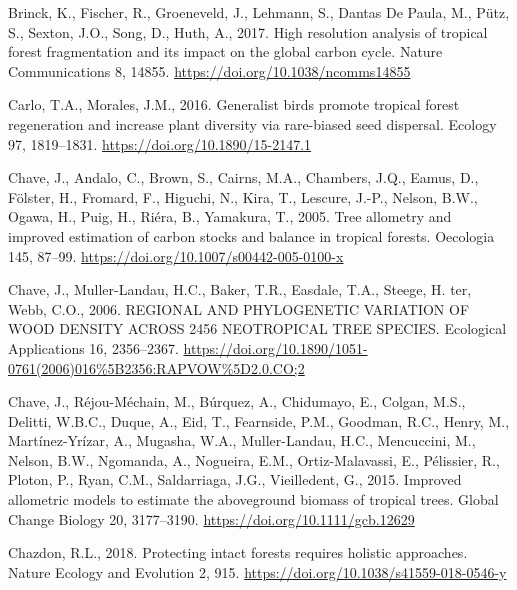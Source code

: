 \documentclass[
  12pt,
]{article}
\newlength{\cslhangindent}
\newlength{\cslentryspacingunit} %
\newenvironment{CSLReferences}[2] %
 {%
  \setlength{\parindent}{0pt}
  \ifodd #1
  \let\oldpar\par
  \def\par{\hangindent=\cslhangindent\oldpar}
  \fi
  \setlength{\parskip}{#2\cslentryspacingunit}
 }%
 {}
\begin{document}
\begin{CSLReferences}{1}{0}
\leavevmode{}%
Brinck, K., Fischer, R., Groeneveld, J., Lehmann, S., Dantas De Paula, M., Pütz, S., Sexton, J.O., Song, D., Huth, A., 2017. High resolution analysis of tropical forest fragmentation and its impact on the global carbon cycle. Nature Communications 8, 14855. \url{https://doi.org/10.1038/ncomms14855}

\leavevmode{}%
Carlo, T.A., Morales, J.M., 2016. Generalist birds promote tropical forest regeneration and increase plant diversity via rare-biased seed dispersal. Ecology 97, 1819--1831. \url{https://doi.org/10.1890/15-2147.1}

\leavevmode{}%
Chave, J., Andalo, C., Brown, S., Cairns, M.A., Chambers, J.Q., Eamus, D., Fölster, H., Fromard, F., Higuchi, N., Kira, T., Lescure, J.-P., Nelson, B.W., Ogawa, H., Puig, H., Riéra, B., Yamakura, T., 2005. Tree allometry and improved estimation of carbon stocks and balance in tropical forests. Oecologia 145, 87--99. \url{https://doi.org/10.1007/s00442-005-0100-x}

\leavevmode{}%
Chave, J., Muller-Landau, H.C., Baker, T.R., Easdale, T.A., Steege, H. ter, Webb, C.O., 2006. {REGIONAL AND PHYLOGENETIC VARIATION OF WOOD DENSITY ACROSS} 2456 {NEOTROPICAL TREE SPECIES}. Ecological Applications 16, 2356--2367. \url{https://doi.org/10.1890/1051-0761(2006)016\%5B2356:RAPVOW\%5D2.0.CO;2}

\leavevmode{}%
Chave, J., Réjou-Méchain, M., Búrquez, A., Chidumayo, E., Colgan, M.S., Delitti, W.B.C., Duque, A., Eid, T., Fearnside, P.M., Goodman, R.C., Henry, M., Martínez-Yrízar, A., Mugasha, W.A., Muller-Landau, H.C., Mencuccini, M., Nelson, B.W., Ngomanda, A., Nogueira, E.M., Ortiz-Malavassi, E., Pélissier, R., Ploton, P., Ryan, C.M., Saldarriaga, J.G., Vieilledent, G., 2015. Improved allometric models to estimate the aboveground biomass of tropical trees. Global Change Biology 20, 3177--3190. \url{https://doi.org/10.1111/gcb.12629}

\leavevmode{}%
Chazdon, R.L., 2018. Protecting intact forests requires holistic approaches. Nature Ecology and Evolution 2, 915. \url{https://doi.org/10.1038/s41559-018-0546-y}


\end{CSLReferences}
\end{document}
